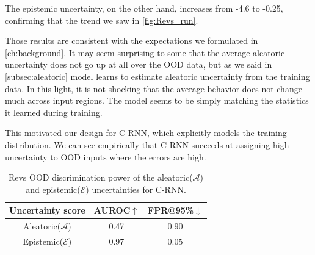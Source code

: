 The epistemic uncertainty, on the other hand, increases from -4.6 to -0.25, confirming that the trend we saw in \cref{fig:Revs_run}.

  
  
  


Those results are consistent with the expectations we formulated in \cref{ch:background}. It may seem surprising to some that the average aleatoric uncertainty does not go up at all over the OOD data, but as we said in \cref{subsec:aleatoric} model learns to estimate aleatoric uncertainty from the training data. In this light, it is not shocking that the average behavior does not change much across input regions. The model seems to be simply matching the statistics it learned during training. 

This motivated our design for C-RNN, which explicitly models the training distribution. We can see empirically that C-RNN succeeds at assigning high uncertainty to OOD inputs where the errors are high.   


\begin{table}[htbp]
\centering
    \begin{tabular}{c  c  c}  
        \toprule
        Uncertainty score & AUROC$\uparrow$ & FPR@95\%$\downarrow$\\
        \midrule
        Aleatoric($\mathcal{A}$) & 0.47  & 0.90\\
        Epistemic($\mathcal{E}$) & 0.97 &  0.05 \\
        \midrule
    \end{tabular}
    \caption[Revs OOD discrimination power for C-RNN]{Revs OOD discrimination power of the aleatoric($\mathcal{A}$) and epistemic($\mathcal{E}$) uncertainties for C-RNN.}
    \label{tbl:revs_discrimination}
\end{table}


